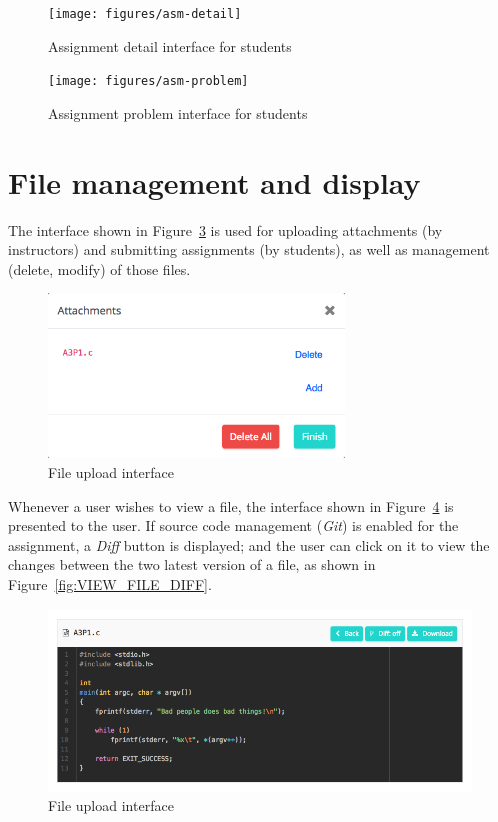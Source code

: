 \begin{figure}[H]
    \centering
        \texttt{[image: figures/asm-detail]}
    \caption{Assignment detail interface for students}
    \label{fig:ASM_DETAIL}
\end{figure}

\begin{figure}[H]
    \centering
        \texttt{[image: figures/asm-problem]}
    \caption{Assignment problem interface for students}
    \label{fig:ASM_PROBLEM}
\end{figure}


\section{File management and display}

The interface shown in Figure~\ref{fig:FILE_UPLOAD} is used for uploading
attachments (by instructors) and submitting assignments (by students), as well
as management (delete, modify) of those files.

\begin{figure}[H]
    \centering
        \includegraphics[width=0.7\textwidth]{figures/file-upload}
    \caption{File upload interface}
    \label{fig:FILE_UPLOAD}
\end{figure}

Whenever a user wishes to view a file, the interface shown in
Figure~\ref{fig:VIEW_FILE} is presented to the user. If source code management
(\emph{Git}) is enabled for the assignment, a \emph{Diff} button is displayed;
and the user can click on it to view the changes between the two latest
version of a file, as shown in Figure~\ref{fig:VIEW_FILE_DIFF}.

\begin{figure}[H]
    \centering
        \includegraphics[width=1.0\textwidth]{figures/view-file}
    \caption{File upload interface}
    \label{fig:VIEW_FILE}
\end{figure}

